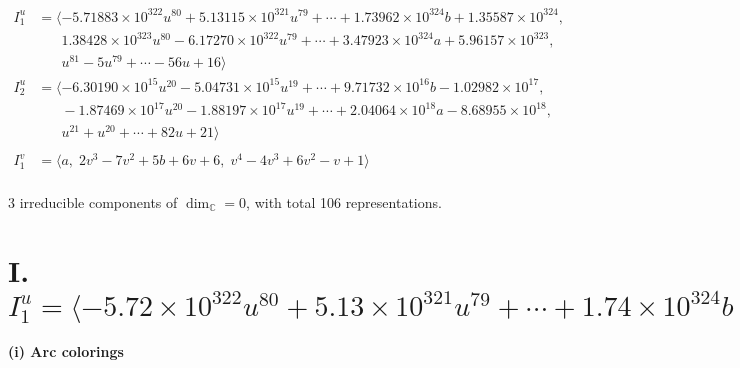 \documentclass[1p]{elsarticle_modified}
\theoremstyle{definition}
\begin{document}
\begin{align*}
I^u_{1}&=\langle 
-5.71883\times10^{322} u^{80}+5.13115\times10^{321} u^{79}+\cdots+1.73962\times10^{324} b+1.35587\times10^{324},\\
\phantom{I^u_{1}}&\phantom{= \langle  }1.38428\times10^{323} u^{80}-6.17270\times10^{322} u^{79}+\cdots+3.47923\times10^{324} a+5.96157\times10^{323},\\
\phantom{I^u_{1}}&\phantom{= \langle  }u^{81}-5 u^{79}+\cdots-56 u+16\rangle \\
I^u_{2}&=\langle 
-6.30190\times10^{15} u^{20}-5.04731\times10^{15} u^{19}+\cdots+9.71732\times10^{16} b-1.02982\times10^{17},\\
\phantom{I^u_{2}}&\phantom{= \langle  }-1.87469\times10^{17} u^{20}-1.88197\times10^{17} u^{19}+\cdots+2.04064\times10^{18} a-8.68955\times10^{18},\\
\phantom{I^u_{2}}&\phantom{= \langle  }u^{21}+u^{20}+\cdots+82 u+21\rangle \\
\\
I^v_{1}&=\langle 
a,\;2 v^3-7 v^2+5 b+6 v+6,\;v^4-4 v^3+6 v^2- v+1\rangle \\
\end{align*}
\raggedright * 3 irreducible components of $\dim_{\mathbb{C}}=0$, with total 106 representations.\\
\newpage
\renewcommand{\arraystretch}{1}
\centering \section*{I. $I^u_{1}= \langle -5.72\times10^{322} u^{80}+5.13\times10^{321} u^{79}+\cdots+1.74\times10^{324} b+1.36\times10^{324},\;1.38\times10^{323} u^{80}-6.17\times10^{322} u^{79}+\cdots+3.48\times10^{324} a+5.96\times10^{323},\;u^{81}-5 u^{79}+\cdots-56 u+16 \rangle$}
\flushleft \textbf{(i) Arc colorings}\\
\end{document}
